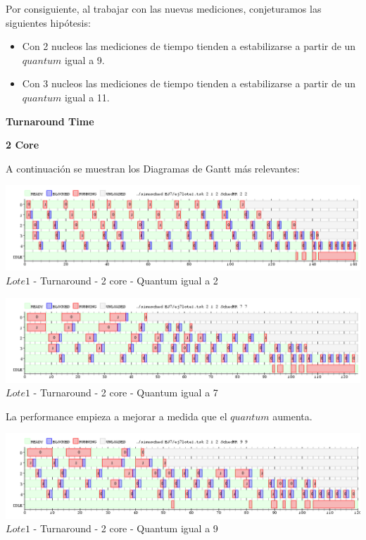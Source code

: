  \indent Por consiguiente, al trabajar con las nuevas mediciones, conjeturamos las siguientes hipótesis:
 
 \begin{itemize}
  \item Con 2 nucleos las mediciones de tiempo tienden a estabilizarse a partir de un $quantum$ igual a 9.
  \item Con 3 nucleos las mediciones de tiempo tienden a estabilizarse a partir de un $quantum$ igual a 11.
 \end{itemize}
 \begin{center}
 \textbf{Turnaround Time} 
  \end{center}

 \begin{center}
 \textbf{2 Core}
 \end{center}
  A continuación se muestran los Diagramas de Gantt más relevantes:
  
  \begin{center}
    	\includegraphics[width=450pt]{./EJ7/ej7tour2core1quan.png}
	{$Lote 1$ - Turnaround - 2 core - Quantum igual a 2}	
 \end{center}

   \begin{center}
    	\includegraphics[width=450pt]{./EJ7/ej7tour2core3quan.png}
	{$Lote 1$ - Turnaround - 2 core - Quantum igual a 7}	
 \end{center}
 
 
 \indent La performance empieza a mejorar a medida que el $quantum$ aumenta.
 
   \begin{center}
    	\includegraphics[width=450pt]{./EJ7/ej7tour2core4quan.png}
	{$Lote 1$ - Turnaround - 2 core - Quantum igual a 9}	
 \end{center}

